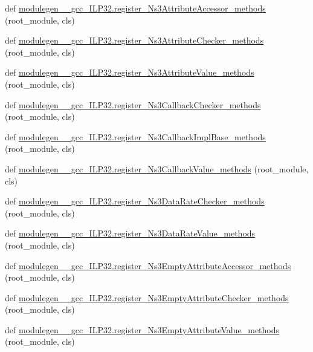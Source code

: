 \begin{DoxyCompactItemize}
\item 
def \hyperlink{namespacemodulegen____gcc__ILP32_a8f1258b8ab8ec43af174fc3ff9198eb6}{modulegen\+\_\+\+\_\+gcc\+\_\+\+I\+L\+P32.\+register\+\_\+\+Ns3\+Attribute\+Accessor\+\_\+methods} (root\+\_\+module, cls)
\item 
def \hyperlink{namespacemodulegen____gcc__ILP32_a891dd82b08e1260e01670cf52c90138c}{modulegen\+\_\+\+\_\+gcc\+\_\+\+I\+L\+P32.\+register\+\_\+\+Ns3\+Attribute\+Checker\+\_\+methods} (root\+\_\+module, cls)
\item 
def \hyperlink{namespacemodulegen____gcc__ILP32_a7475be8fb4d2d4611c513f6d21c50a32}{modulegen\+\_\+\+\_\+gcc\+\_\+\+I\+L\+P32.\+register\+\_\+\+Ns3\+Attribute\+Value\+\_\+methods} (root\+\_\+module, cls)
\item 
def \hyperlink{namespacemodulegen____gcc__ILP32_acf2267ead3a407631a6fe495c0560d6b}{modulegen\+\_\+\+\_\+gcc\+\_\+\+I\+L\+P32.\+register\+\_\+\+Ns3\+Callback\+Checker\+\_\+methods} (root\+\_\+module, cls)
\item 
def \hyperlink{namespacemodulegen____gcc__ILP32_a9a85026102c692583453c9b637b8b837}{modulegen\+\_\+\+\_\+gcc\+\_\+\+I\+L\+P32.\+register\+\_\+\+Ns3\+Callback\+Impl\+Base\+\_\+methods} (root\+\_\+module, cls)
\item 
def \hyperlink{namespacemodulegen____gcc__ILP32_a08e2760d3ccd91256fbce9ef63b1e10b}{modulegen\+\_\+\+\_\+gcc\+\_\+\+I\+L\+P32.\+register\+\_\+\+Ns3\+Callback\+Value\+\_\+methods} (root\+\_\+module, cls)
\item 
def \hyperlink{namespacemodulegen____gcc__ILP32_a29fce5b90bb63029c10e1f6c31445ef8}{modulegen\+\_\+\+\_\+gcc\+\_\+\+I\+L\+P32.\+register\+\_\+\+Ns3\+Data\+Rate\+Checker\+\_\+methods} (root\+\_\+module, cls)
\item 
def \hyperlink{namespacemodulegen____gcc__ILP32_ae9a5e4f1c8744f24232f30ba6195316c}{modulegen\+\_\+\+\_\+gcc\+\_\+\+I\+L\+P32.\+register\+\_\+\+Ns3\+Data\+Rate\+Value\+\_\+methods} (root\+\_\+module, cls)
\item 
def \hyperlink{namespacemodulegen____gcc__ILP32_a489a942ef59028089c93b9dea61069a3}{modulegen\+\_\+\+\_\+gcc\+\_\+\+I\+L\+P32.\+register\+\_\+\+Ns3\+Empty\+Attribute\+Accessor\+\_\+methods} (root\+\_\+module, cls)
\item 
def \hyperlink{namespacemodulegen____gcc__ILP32_a46ed8d8e239b38c1a4353a533fcb77a2}{modulegen\+\_\+\+\_\+gcc\+\_\+\+I\+L\+P32.\+register\+\_\+\+Ns3\+Empty\+Attribute\+Checker\+\_\+methods} (root\+\_\+module, cls)
\item 
def \hyperlink{namespacemodulegen____gcc__ILP32_a4f1a7f7e506590df165bd2f16ec88878}{modulegen\+\_\+\+\_\+gcc\+\_\+\+I\+L\+P32.\+register\+\_\+\+Ns3\+Empty\+Attribute\+Value\+\_\+methods} (root\+\_\+module, cls)

\end{DoxyCompactItemize}
